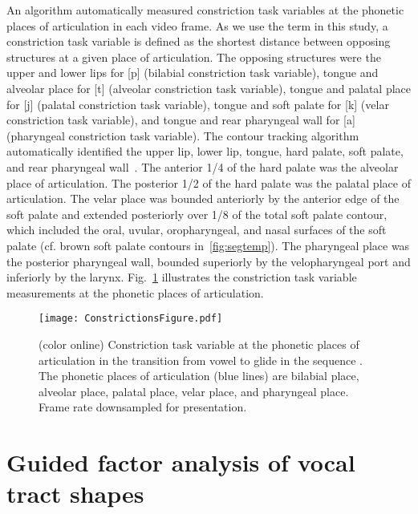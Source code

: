 \documentclass[reprint]{JASAnew}\usepackage[]{graphicx}\usepackage[]{color}
\begin{document}
An algorithm automatically measured constriction task variables at the phonetic places of articulation in each video frame. 
%
As we use the term in this study, a constriction task variable is defined as the shortest distance between opposing structures at a given place of articulation. 
%
The opposing structures were the upper and lower lips for [p] (bilabial constriction task variable), tongue and alveolar place for [t] (alveolar constriction task variable), tongue and palatal place for [j] (palatal constriction task variable), tongue and soft palate for [k] (velar constriction task variable), and tongue and rear pharyngeal wall for [a] (pharyngeal constriction task variable). 
%
The contour tracking algorithm automatically identified the upper lip, lower lip, tongue, hard palate, soft palate, and rear pharyngeal wall~\citep{bresch2009region}.  
%
The anterior \num{1/4} of the hard palate was the alveolar place of articulation. 
%
The posterior \num{1/2} of the hard palate was the palatal place of articulation.
%
The velar place was bounded anteriorly by the anterior edge of the soft palate and extended posteriorly over \num{1/8} of the total soft palate contour, which included the oral, uvular, oropharyngeal, and nasal surfaces of the soft palate (cf. brown soft palate contours in~\ref{fig:segtemp}).
%
The pharyngeal place was the posterior pharyngeal wall, bounded superiorly by the velopharyngeal port and inferiorly by the larynx. 
%
Fig.~\ref{fig:constrictions} illustrates the constriction task variable measurements at the phonetic places of articulation.


\begin{figure}

\texttt{[image: ConstrictionsFigure.pdf]}

\caption{(color online) Constriction task variable at the phonetic places of articulation in the transition from vowel \textipa{[a]} to glide \textipa{[j]} in the sequence \textipa{[aja]}. The phonetic places of articulation (blue lines) are bilabial place, alveolar place, palatal place, velar place, and pharyngeal place. Frame rate downsampled for presentation.}
\label{fig:constrictions}
\end{figure}




\section{Guided factor analysis of vocal tract shapes}
\label{sec:gfa}
\end{document}
